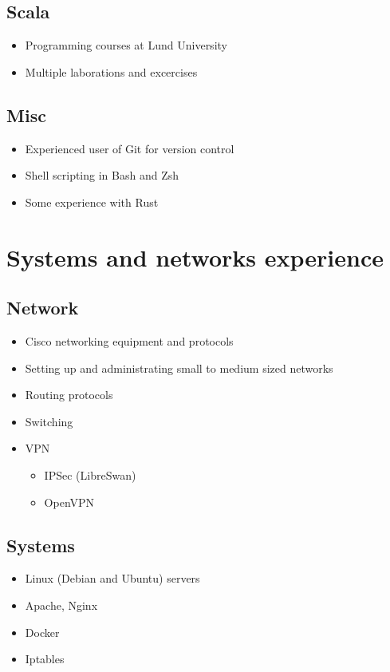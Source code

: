 \documentclass[a4paper, 11pt]{article}
\begin{document}
        \subsection*{Scala}
            \begin{itemize}
                \item Programming courses at Lund University
                \item Multiple laborations and excercises
            \end{itemize}

        \subsection*{Misc}
            \begin{itemize}
                \item Experienced user of Git for version control
                \item Shell scripting in Bash and Zsh
                \item Some experience with Rust
            \end{itemize}


    \section*{Systems and networks experience}

        \subsection*{Network}
            \begin{itemize}
                \item Cisco networking equipment and protocols
                \item Setting up and administrating small to medium sized networks
                \item Routing protocols
                \item Switching
                \item VPN
                \begin{itemize}
                    \item IPSec (LibreSwan)
                    \item OpenVPN
                \end{itemize}
            \end{itemize}

        \subsection*{Systems}
            \begin{itemize}
                \item Linux (Debian and Ubuntu) servers
                \item Apache, Nginx
                \item Docker
                \item Iptables
            \end{itemize}
\end{document}
